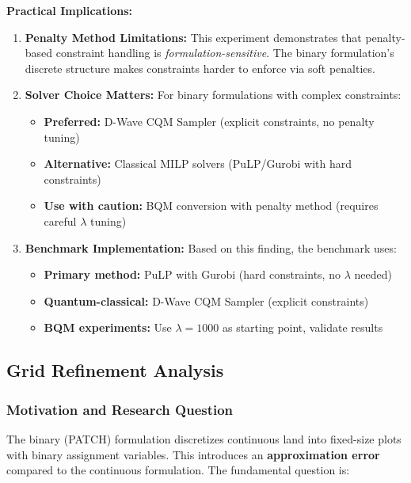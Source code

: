 \documentclass{oqireport}
\begin{document}
\textbf{Practical Implications:}

\begin{enumerate}
    \item \textbf{Penalty Method Limitations:} This experiment demonstrates that penalty-based constraint handling is \textit{formulation-sensitive}. The binary formulation's discrete structure makes constraints harder to enforce via soft penalties.
    
    \item \textbf{Solver Choice Matters:} For binary formulations with complex constraints:
    \begin{itemize}
        \item \textbf{Preferred:} D-Wave CQM Sampler (explicit constraints, no penalty tuning)
        \item \textbf{Alternative:} Classical MILP solvers (PuLP/Gurobi with hard constraints)
        \item \textbf{Use with caution:} BQM conversion with penalty method (requires careful $\lambda$ tuning)
    \end{itemize}
    
    \item \textbf{Benchmark Implementation:} Based on this finding, the benchmark uses:
    \begin{itemize}
        \item \textbf{Primary method:} PuLP with Gurobi (hard constraints, no $\lambda$ needed)
        \item \textbf{Quantum-classical:} D-Wave CQM Sampler (explicit constraints)
        \item \textbf{BQM experiments:} Use $\lambda = 1000$ as starting point, validate results
    \end{itemize}
\end{enumerate}



\newpage
\subsection{Grid Refinement Analysis}\label{sub:refinement}

\subsubsection{Motivation and Research Question}

The binary (PATCH) formulation discretizes continuous land into fixed-size plots with binary assignment variables. This introduces an \textbf{approximation error} compared to the continuous formulation. The fundamental question is:
\end{document}
